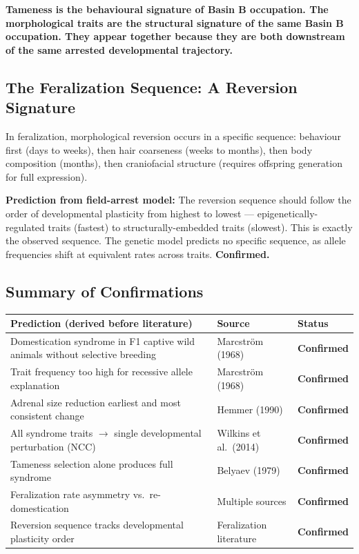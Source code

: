 \documentclass[11pt, a4paper]{article}
\begin{document}
\textbf{Tameness is the behavioural signature of
Basin B occupation. The morphological traits are the
structural signature of the same Basin B occupation.
They appear together because they are both downstream
of the same arrested developmental trajectory.}

\subsection{The Feralization Sequence: A Reversion
Signature}

In feralization, morphological reversion occurs in
a specific sequence: behaviour first (days to weeks),
then hair coarseness (weeks to months), then body
composition (months), then craniofacial structure
(requires offspring generation for full expression).

\textbf{Prediction from field-arrest model:}
The reversion sequence should follow the order of
developmental plasticity from highest to lowest ---
epigenetically-regulated traits (fastest) to
structurally-embedded traits (slowest). This is
exactly the observed sequence. The genetic model
predicts no specific sequence, as allele frequencies
shift at equivalent rates across traits.
\textbf{Confirmed.}

\subsection{Summary of Confirmations}

\begin{center}
\small
\begin{tabular}{p{5.5cm}p{3.5cm}p{3.0cm}}
\toprule
\textbf{Prediction (derived before literature)} &
\textbf{Source} & \textbf{Status} \\
\midrule
Domestication syndrome in F1 captive wild
animals without selective breeding &
Marcstr\"{o}m (1968) & \textbf{Confirmed} \\[0.3em]
Trait frequency too high for recessive allele
explanation &
Marcstr\"{o}m (1968) & \textbf{Confirmed} \\[0.3em]
Adrenal size reduction earliest and most
consistent change &
Hemmer (1990) & \textbf{Confirmed} \\[0.3em]
All syndrome traits $\rightarrow$ single
developmental perturbation (NCC) &
Wilkins et al.\ (2014) & \textbf{Confirmed} \\[0.3em]
Tameness selection alone produces full
syndrome &
Belyaev (1979) & \textbf{Confirmed} \\[0.3em]
Feralization rate asymmetry vs.\
re-domestication &
Multiple sources & \textbf{Confirmed} \\[0.3em]
Reversion sequence tracks developmental
plasticity order &
Feralization literature & \textbf{Confirmed} \\
\bottomrule
\end{tabular}
\end{center}
\end{document}
